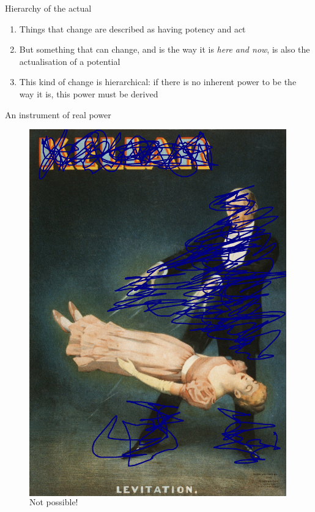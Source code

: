 \documentclass[xcolor=dvipsnames]{beamer}
\begin{document}
\begin{frame}[fragile]{Hierarchy of the actual}
  \begin{enumerate}
  \item Things that change are described as having potency and act \vspace{5mm}
  \item But something that can change, and is the way it is \emph{here and now}, is also the actualisation of a potential \vspace{5mm}
    \item This kind of change is hierarchical: if there is no inherent power to be the way it is, this power must be derived
  \end{enumerate}
\end{frame}

\begin{frame}{An instrument of real power}
\begin{figure}
  \centering
  \begin{columns}
    \centering
    \caption {Not possible!}
    \includegraphics[width=0.99\textwidth]{levitation2}

\end{columns}
\end{figure}
\end{frame}
\end{document}
